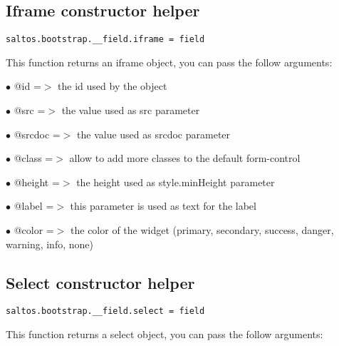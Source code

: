 \documentclass[a4paper]{book}
\begin{document}
\hypertarget{toc471}{}
\subsection{Iframe constructor helper}

\begin{lstlisting}
saltos.bootstrap.__field.iframe = field
\end{lstlisting}

This function returns an iframe object, you can pass the follow arguments:

\begin{compactitem}
\item[\color{myblue}$\bullet$] @id     =$>$ the id used by the object
\item[\color{myblue}$\bullet$] @src    =$>$ the value used as src parameter
\item[\color{myblue}$\bullet$] @srcdoc =$>$ the value used as srcdoc parameter
\item[\color{myblue}$\bullet$] @class  =$>$ allow to add more classes to the default form-control
\item[\color{myblue}$\bullet$] @height =$>$ the height used as style.minHeight parameter
\item[\color{myblue}$\bullet$] @label  =$>$ this parameter is used as text for the label
\item[\color{myblue}$\bullet$] @color  =$>$ the color of the widget (primary, secondary, success, danger, warning, info, none)
\end{compactitem}

\hypertarget{toc472}{}
\subsection{Select constructor helper}

\begin{lstlisting}
saltos.bootstrap.__field.select = field
\end{lstlisting}

This function returns a select object, you can pass the follow arguments:
\end{document}
